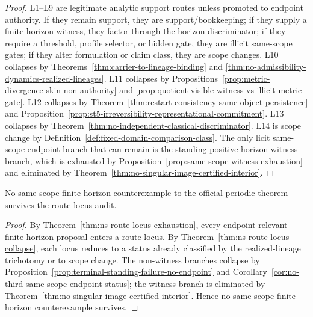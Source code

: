 \begin{proof}
L1--L9 are legitimate analytic support routes unless promoted to endpoint authority. If they remain support, they are support/bookkeeping; if they supply a finite-horizon witness, they factor through the horizon discriminator; if they require a threshold, profile selector, or hidden gate, they are illicit same-scope gates; if they alter formulation or claim class, they are scope changes. L10 collapses by Theorems~\ref{thm:carrier-to-lineage-binding} and \ref{thm:no-admissibility-dynamics-realized-lineages}. L11 collapses by Propositions~\ref{prop:metric-divergence-skin-non-authority} and \ref{prop:quotient-visible-witness-vs-illicit-metric-gate}. L12 collapses by Theorem~\ref{thm:restart-consistency-same-object-persistence} and Proposition~\ref{prop:st5-irreversibility-representational-commitment}. L13 collapses by Theorem~\ref{thm:no-independent-classical-discriminator}. L14 is scope change by Definition~\ref{def:fixed-domain-comparison-class}. The only licit same-scope endpoint branch that can remain is the standing-positive horizon-witness branch, which is exhausted by Proposition~\ref{prop:same-scope-witness-exhaustion} and eliminated by Theorem~\ref{thm:no-singular-image-certified-interior}.
\end{proof}

\begin{corollary}\label{cor:ns-no-route-locus-counterexample}
No same-scope finite-horizon counterexample to the official periodic theorem survives the route-locus audit.
\end{corollary}

\begin{proof}
By Theorem~\ref{thm:ns-route-locus-exhaustion}, every endpoint-relevant finite-horizon proposal enters a route locus. By Theorem~\ref{thm:ns-route-locus-collapse}, each locus reduces to a status already classified by the realized-lineage trichotomy or to scope change. The non-witness branches collapse by Proposition~\ref{prop:terminal-standing-failure-no-endpoint} and Corollary~\ref{cor:no-third-same-scope-endpoint-status}; the witness branch is eliminated by Theorem~\ref{thm:no-singular-image-certified-interior}. Hence no same-scope finite-horizon counterexample survives.
\end{proof}
